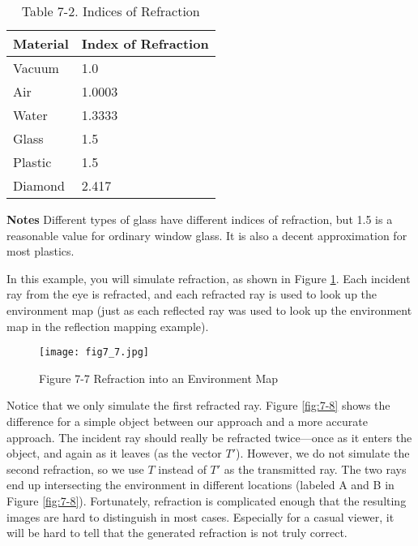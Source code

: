 \documentclass[../main.tex]{subfiles}
\begin{document}
\begin{table}
\centering
\begin{tabular}{ p{2cm} p{4cm} } 

Material & Index of Refraction \\
\hline

Vacuum & 1.0 \\
Air & 1.0003 \\
Water & 1.3333 \\
Glass & 1.5 \\
Plastic & 1.5 \\
Diamond & 2.417 \\

\hline

\end{tabular}

\caption{Table 7-2. Indices of Refraction}
\label{table:7-2}

\textbf{Notes}
Different types of glass have different indices of refraction, but 1.5 is a reasonable value for ordinary window glass. It is also a decent approximation for most plastics.

\end{table}

In this example, you will simulate refraction, as shown in Figure \ref{fig:7-7}. Each incident ray from the eye is refracted, and each refracted ray is used to look up the environment map (just as each reflected ray was used to look up the environment map in the reflection mapping example).

\begin{figure}
    \centering
    \texttt{[image: fig7\_7.jpg]}
    \caption{Figure 7-7 Refraction into an Environment Map}
    \label{fig:7-7}
\end{figure}

Notice that we only simulate the first refracted ray. Figure \ref{fig:7-8} shows the difference for a simple object between our approach and a more accurate approach. The incident ray should really be refracted twice—once as it enters the object, and again as it leaves (as the vector $T'$). However, we do not simulate the second refraction, so we use $T$ instead of $T'$ as the transmitted ray. The two rays end up intersecting the environment in different locations (labeled A and B in Figure \ref{fig:7-8}). Fortunately, refraction is complicated enough that the resulting images are hard to distinguish in most cases. Especially for a casual viewer, it will be hard to tell that the generated refraction is not truly correct.
\end{document}

